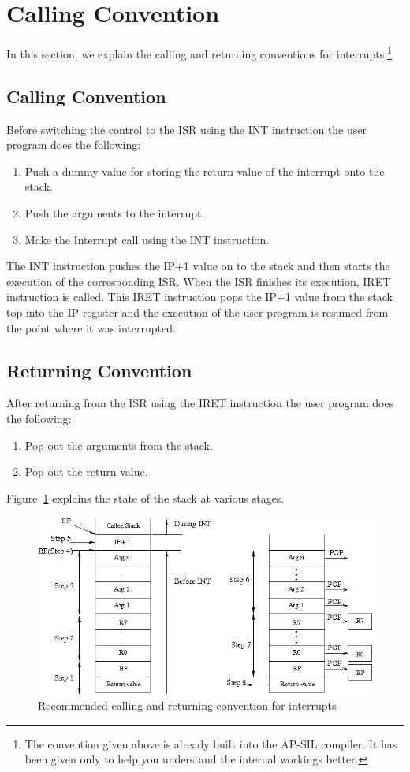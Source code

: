 \section{Calling Convention}
\label{callconv}
In this section, we explain the calling and returning conventions for interrupts.\footnote{The convention given above is already built into the AP-SIL compiler. It has been given only to help you understand the internal workings better.}

\subsection{Calling Convention}
Before switching the control to the ISR using the INT instruction the user program does the following:
\begin{enumerate}
	\item Push a dummy value for storing the return value of the interrupt onto the stack.
	\item Push the arguments to the interrupt.
	\item Make the Interrupt call using the INT instruction.
\end{enumerate}

The INT instruction pushes the IP+1 value on to the stack and then starts the execution of the corresponding ISR. When the ISR finishes its execution, IRET instruction is called. This IRET instruction pops the IP+1 value from the stack top into the IP register and the execution of the user program is resumed from the point where it was interrupted.

\subsection{Returning Convention}
After returning from the ISR using the IRET instruction the user program does the following:
\begin{enumerate}
	\item Pop out the arguments from the stack.
	\item Pop out the return value.
\end{enumerate}

Figure~\ref{fig:calling_convention} explains the state of the stack at various stages.

\begin{figure}[htp!]
	\centering
	\includegraphics[scale=0.55]{pics/calling_convention}
	\caption{Recommended calling and returning convention for interrupts}
	\label{fig:calling_convention}
\end{figure}
